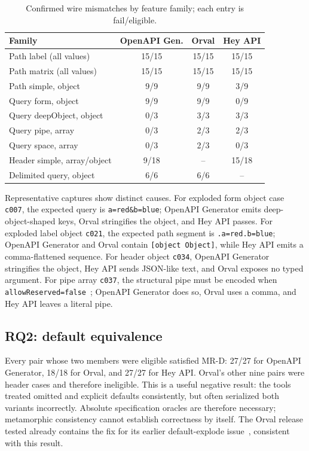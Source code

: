 \documentclass[runningheads]{llncs}
\begin{document}
\begin{table}[t]
\caption{Confirmed wire mismatches by feature family; each entry is fail/eligible.}
\label{tab:families}
\centering\small
\begin{tabular}{@{}lccc@{}}
\toprule
Family & OpenAPI Gen. & Orval & Hey API\\ \midrule
Path label (all values) &15/15&15/15&15/15\\
Path matrix (all values)&15/15&15/15&15/15\\
Path simple, object&9/9&9/9&3/9\\
Query form, object&9/9&9/9&0/9\\
Query deepObject, object&0/3&3/3&3/3\\
Query pipe, array&0/3&2/3&2/3\\
Query space, array&0/3&2/3&0/3\\
Header simple, array/object&9/18&--&15/18\\
Delimited query, object&6/6&6/6&--\\
\bottomrule
\end{tabular}
\end{table}

Representative captures show distinct causes. For exploded form object case \texttt{c007}, the expected query is \texttt{a=red\&b=blue}; OpenAPI Generator emits deep-object-shaped keys, Orval stringifies the object, and Hey API passes. For exploded label object \texttt{c021}, the expected path segment is \texttt{.a=red.b=blue}; OpenAPI Generator and Orval contain \texttt{[object Object]}, while Hey API emits a comma-flattened sequence. For header object \texttt{c034}, OpenAPI Generator stringifies the object, Hey API sends JSON-like text, and Orval exposes no typed argument. For pipe array \texttt{c037}, the structural pipe must be encoded when \texttt{allowReserved=false}~\cite{oas}; OpenAPI Generator does so, Orval uses a comma, and Hey API leaves a literal pipe.

\subsection{RQ2: default equivalence}

Every pair whose two members were eligible satisfied MR-D: 27/27 for OpenAPI Generator, 18/18 for Orval, and 27/27 for Hey API. Orval's other nine pairs were header cases and therefore ineligible. This is a useful negative result: the tools treated omitted and explicit defaults consistently, but often serialized both variants incorrectly. Absolute specification oracles are therefore necessary; metamorphic consistency cannot establish correctness by itself. The Orval release tested already contains the fix for its earlier default-explode issue~\cite{orvalissue}, consistent with this result.
\end{document}
